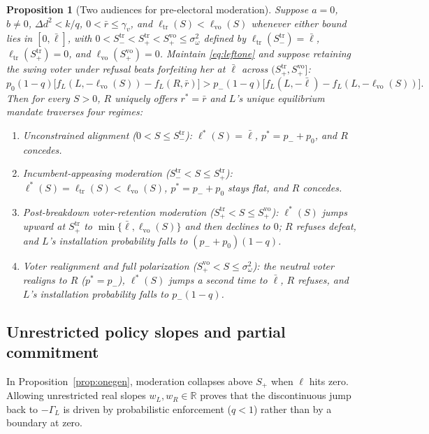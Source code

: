 \documentclass[11pt,letterpaper]{article}
\newtheorem{proposition}{Proposition}
\newcommand{\Dd}{\Delta d}
\begin{document}
\begin{proposition}[Two audiences for pre-electoral moderation]\label{prop:realign}
Suppose $a=0$, $b\ne 0$, $\Dd^2<k/q$, $0<\bar r\le\gamma_v$, and $\ell_{\mathrm{tr}}(S)<\ell_{\mathrm{vo}}(S)$ whenever either bound lies in $[0,\bar\ell]$, with $0<S_-^{\mathrm{tr}}<S_+^{\mathrm{tr}}<S_+^{\mathrm{vo}}\le\sigma_\omega^2$ defined by $\ell_{\mathrm{tr}}(S_-^{\mathrm{tr}})=\bar\ell$, $\ell_{\mathrm{tr}}(S_+^{\mathrm{tr}})=0$, and $\ell_{\mathrm{vo}}(S_+^{\mathrm{vo}})=0$. Maintain \eqref{eq:leftone} and suppose retaining the swing voter under refusal beats forfeiting her at $\bar\ell$ across $(S_+^{\mathrm{tr}},S_+^{\mathrm{vo}}]$:
\begin{equation}
 p_0(1-q)\big[f_L(L,-\ell_{\mathrm{vo}}(S))-f_L(R,\bar r)\big]
 > p_-(1-q)\big[f_L(L,-\bar\ell)-f_L(L,-\ell_{\mathrm{vo}}(S))\big].
 \label{eq:voterretain}
\end{equation}
Then for every $S>0$, $R$ uniquely offers $r^*=\bar r$ and $L$'s unique equilibrium mandate traverses four regimes:
\begin{enumerate}
\item \emph{Unconstrained alignment} ($0<S\le S_-^{\mathrm{tr}}$): $\ell^*(S)=\bar\ell$, $p^*=p_-+p_0$, and $R$ concedes.
\item \emph{Incumbent-appeasing moderation} ($S_-^{\mathrm{tr}}<S\le S_+^{\mathrm{tr}}$): $\ell^*(S)=\ell_{\mathrm{tr}}(S)<\ell_{\mathrm{vo}}(S)$, $p^*=p_-+p_0$ stays flat, and $R$ concedes.
\item \emph{Post-breakdown voter-retention moderation} ($S_+^{\mathrm{tr}}<S\le S_+^{\mathrm{vo}}$): $\ell^*(S)$ jumps upward at $S_+^{\mathrm{tr}}$ to $\min\{\bar\ell,\ell_{\mathrm{vo}}(S)\}$ and then declines to $0$; $R$ refuses defeat, and $L$'s installation probability falls to $(p_-+p_0)(1-q)$.
\item \emph{Voter realignment and full polarization} ($S_+^{\mathrm{vo}}<S\le\sigma_\omega^2$): the neutral voter realigns to $R$ ($p^*=p_-$), $\ell^*(S)$ jumps a second time to $\bar\ell$, $R$ refuses, and $L$'s installation probability falls to $p_-(1-q)$.
\end{enumerate}
\end{proposition}

\subsection{Unrestricted policy slopes and partial commitment}\label{sec:unconstrained}

In Proposition~\ref{prop:onegen}, moderation collapses above $S_+$ when $\ell$ hits zero. Allowing unrestricted real slopes $w_L,w_R\in\mathbb R$ proves that the discontinuous jump back to $-\Gamma_L$ is driven by probabilistic enforcement ($q<1$) rather than by a boundary at zero.
\end{document}
